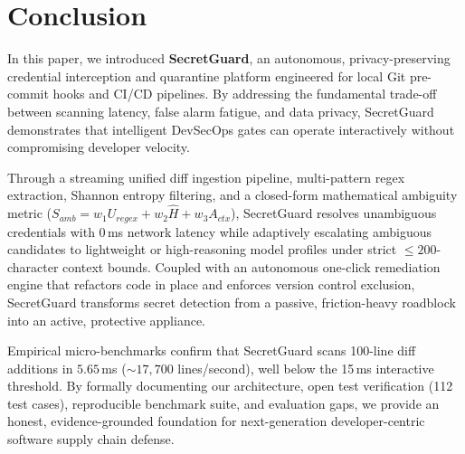 \section{Conclusion}
\label{sec:conclusion}

In this paper, we introduced \textbf{SecretGuard}, an autonomous, privacy-preserving credential interception and quarantine platform engineered for local Git pre-commit hooks and CI/CD pipelines. By addressing the fundamental trade-off between scanning latency, false alarm fatigue, and data privacy, SecretGuard demonstrates that intelligent DevSecOps gates can operate interactively without compromising developer velocity.

Through a streaming unified diff ingestion pipeline, multi-pattern regex extraction, Shannon entropy filtering, and a closed-form mathematical ambiguity metric ($S_{amb} = w_1 U_{regex} + w_2 \hat{H} + w_3 A_{ctx}$), SecretGuard resolves unambiguous credentials with 0\,ms network latency while adaptively escalating ambiguous candidates to lightweight or high-reasoning model profiles under strict $\le 200$-character context bounds. Coupled with an autonomous one-click remediation engine that refactors code in place and enforces version control exclusion, SecretGuard transforms secret detection from a passive, friction-heavy roadblock into an active, protective appliance.

Empirical micro-benchmarks confirm that SecretGuard scans 100-line diff additions in $5.65$\,ms ($\sim 17,700$ lines/second), well below the 15\,ms interactive threshold. By formally documenting our architecture, open test verification (112 test cases), reproducible benchmark suite, and evaluation gaps, we provide an honest, evidence-grounded foundation for next-generation developer-centric software supply chain defense.
